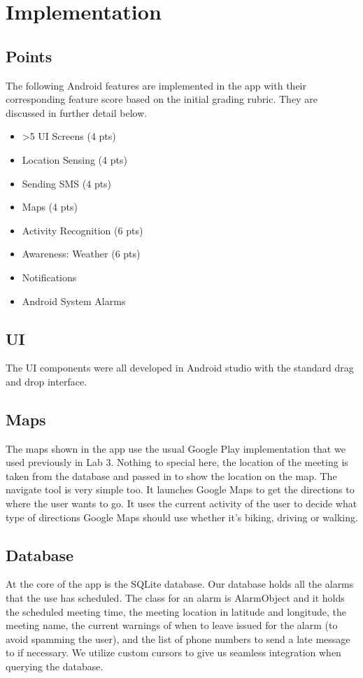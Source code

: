 \section{Implementation}
\subsection{Points}
The following Android features are implemented in the app with their corresponding feature score based on the initial grading rubric.  They are discussed in further detail below.

\begin {itemize}
	\item >5 UI Screens (4 pts)
	\item Location Sensing (4 pts)
	\item Sending SMS (4 pts)
	\item Maps (4 pts)
	\item Activity Recognition (6 pts)
	\item Awareness: Weather (6 pts)
	\item Notifications
	\item Android System Alarms
\end {itemize}

\subsection{UI}
The UI components were all developed in Android studio with the standard drag and drop interface. 

\subsection{Maps}
The maps shown in the app use the usual Google Play implementation that we used previously in Lab 3. Nothing to special here, the location of the meeting is taken from the database and passed in to show the location on the map. The navigate tool is very simple too. It launches Google Maps to get the directions to where the user wants to go. It uses the current activity of the user to decide what type of directions Google Maps should use whether it’s biking, driving or walking.

\subsection{Database}
At the core of the app is the SQLite database.  Our database holds all the alarms that the use has scheduled. The class for an alarm is AlarmObject and it holds the scheduled meeting time, the meeting location in latitude and longitude, the meeting name, the current warnings of when to leave issued for the alarm (to avoid spamming the user), and the list of phone numbers to send a late message to if necessary. We utilize custom cursors to give us seamless integration when querying the database. 

